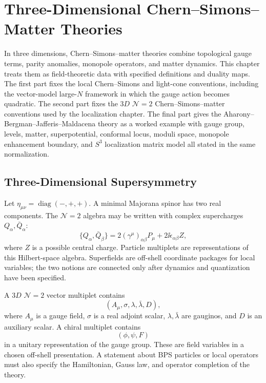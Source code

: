 \chapter{Three-Dimensional Chern--Simons--Matter Theories}
\label{ch:susy-three-dimensional-chern-simons-matter}

\ConventionsMixed

In three dimensions, Chern--Simons--matter theories combine topological gauge
terms, parity anomalies, monopole operators, and matter dynamics.  This chapter
treats them as field-theoretic data with specified definitions and duality
maps.  The first part fixes the local Chern--Simons and light-cone conventions,
including the vector-model large-\(N\) framework in which the gauge action
becomes quadratic.  The second part fixes the \(3D\) \(\mathcal N=2\)
Chern--Simons--matter conventions used by the localization chapter.  The final
part gives the Aharony--Bergman--Jafferis--Maldacena theory as a worked example
with gauge group, levels, matter, superpotential, conformal locus, moduli
space, monopole enhancement boundary, and \(S^3\) localization matrix model all
stated in the same normalization.

\section{Three-Dimensional Supersymmetry}

Let \(\eta_{\mu\nu}=\operatorname{diag}(-,+,+)\).  A minimal Majorana spinor
has two real components.  The \(\mathcal N=2\) algebra may be written with
complex supercharges \(Q_\alpha,\bar Q_\alpha\):
\[
  \{Q_\alpha,\bar Q_\beta\}
  =
  2(\gamma^\mu)_{\alpha\beta}P_\mu
  +2\ii\epsilon_{\alpha\beta}Z,
\]
where \(Z\) is a possible central charge.  Particle multiplets are
representations of this Hilbert-space algebra.  Superfields are off-shell
coordinate packages for local variables; the two notions are connected only
after dynamics and quantization have been specified.

A \(3D\) \(\mathcal N=2\) vector multiplet contains
\[
  (A_\mu,\sigma,\lambda,\bar\lambda,D),
\]
where \(A_\mu\) is a gauge field, \(\sigma\) is a real adjoint scalar,
\(\lambda,\bar\lambda\) are gauginos, and \(D\) is an auxiliary scalar.  A
chiral multiplet contains
\[
  (\phi,\psi,F)
\]
in a unitary representation of the gauge group.  These are field variables
in a chosen off-shell presentation.  A statement about BPS particles or local
operators must also specify the Hamiltonian, Gauss law, and operator
completion of the theory.

